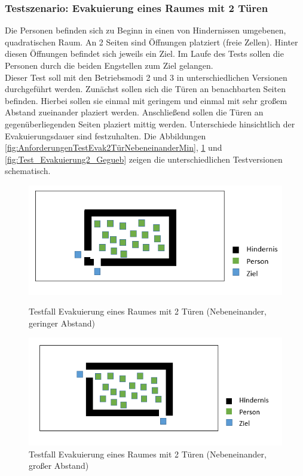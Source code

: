 \subsubsection{Testszenario: Evakuierung eines Raumes mit 2 Türen}
\label{Anforderungen:Evakuierung2}
Die Personen befinden sich zu Beginn in einen von Hindernissen umgebenen, quadratischen Raum. An 2 Seiten sind Öffnungen platziert (freie Zellen). Hinter diesen Öffnungen befindet sich jeweils ein Ziel. Im Laufe des Tests sollen die Personen durch die beiden Engstellen zum Ziel gelangen. \\
Dieser Test soll mit den Betriebsmodi 2 und 3 in unterschiedlichen Versionen durchgeführt werden. Zunächst sollen sich die Türen an benachbarten Seiten befinden. Hierbei sollen sie einmal mit geringem und einmal mit sehr großem Abstand zueinander plaziert werden. Anschließend sollen die Türen an gegenüberliegenden Seiten plaziert mittig werden. Unterschiede hinsichtlich der Evakuierungsdauer sind festzuhalten. Die Abbildungen \ref{fig:AnforderungenTestEvak2TürNebeneinanderMin},  \ref{fig:AnforderungenTestEvak2TürNebeneinanderMax} und  \ref{fig:Test_Evakuierung2_Gegueb} zeigen die unterschiedlichen Testversionen schematisch.

\begin{figure}[!htb]
	\centering
	\begin{minipage}{.5\textwidth}
		\centering
		\includegraphics[width=\textwidth]{abbildungen/Test_Evakuierung2_Nebeneinander.png}
		\caption{Testfall Evakuierung eines Raumes mit 2 Türen (Nebeneinander, geringer Abstand)}
		\label{fig:AnforderungenTestEvak2TürNebeneinanderMin}
	\end{minipage}%
	\begin{minipage}{0.5\textwidth}
		\centering
		\includegraphics[width=\textwidth]{abbildungen/Test_Evakuierung2_NebeneinanderMax.png}
		\caption{Testfall Evakuierung eines Raumes mit 2 Türen (Nebeneinander, großer Abstand)}
		\label{fig:AnforderungenTestEvak2TürNebeneinanderMax}
	\end{minipage}
\end{figure}

